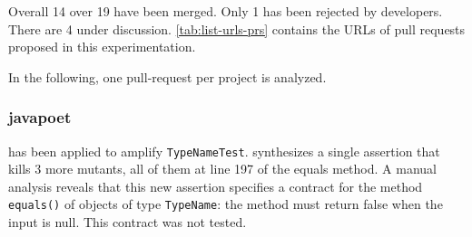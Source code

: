 

Overall 14 over 19 have been merged. 
Only 1 has been rejected by developers. 
There are 4 under discussion.
\autoref{tab:list-urls-prs} contains the URLs of pull requests proposed in this experimentation.

In the following, one pull-request per project is analyzed.

\subsubsection{javapoet}


\dspot has been applied to amplify \texttt{TypeNameTest}. 
\dspot synthesizes a single assertion that kills 3 more mutants, all of them at line 197 of the equals method. 
A manual analysis reveals that this new assertion specifies a contract for the method \texttt{equals()} of objects of type \texttt{TypeName}: 
the method must return false when the input is null. 
This contract was not tested.

